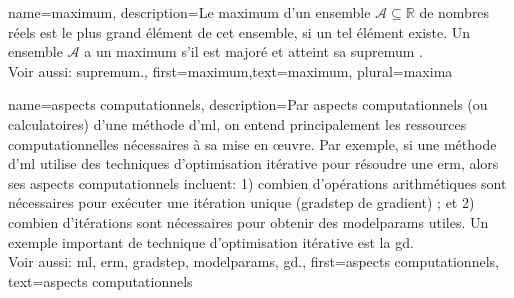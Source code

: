 {
	name=maximum,
	description={Le maximum d’un ensemble $\mathcal{A} \subseteq \mathbb{R}$ de nombres réels est le plus grand élément de cet ensemble, si un tel élément existe. Un ensemble $\mathcal{A}$ a un maximum s’il est majoré et atteint sa \gls{supremum} \cite[Sec.~1.4]{RudinBookPrinciplesMatheAnalysis}.
	\\
	Voir aussi: \gls{supremum}.},
	first={maximum},text={maximum}, plural={maxima}
}

{
	name={aspects computationnels},
	description={Par aspects computationnels (ou calculatoires) d’une méthode d'\gls{ml}, on entend principalement les ressources computationnelles nécessaires à sa mise en œuvre. Par exemple, si une méthode d'\gls{ml} utilise des techniques d’optimisation itérative pour résoudre une \gls{erm}, alors ses aspects computationnels incluent: 1) combien d’opérations arithmétiques sont nécessaires pour exécuter une itération unique (\gls{gradstep} de gradient) ; et 2) combien d’itérations sont nécessaires pour obtenir des \gls{modelparams} utiles. Un exemple important de technique d’optimisation itérative est la \gls{gd}.
		\\ 
		Voir aussi: \gls{ml}, \gls{erm}, \gls{gradstep}, \gls{modelparams}, \gls{gd}.},
	first={aspects computationnels},
	text={aspects computationnels}
}

